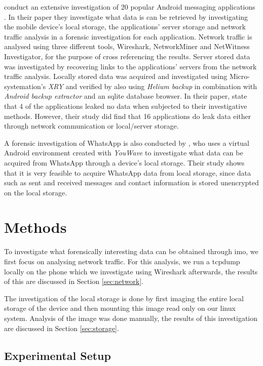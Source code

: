 \documentclass[conference]{IEEEtran}
\begin{document}
\citeauthor{walnycky2015network} conduct an extensive investigation of 20
popular Android messaging applications \cite{walnycky2015network}. In their
paper they investigate what data is can be retrieved by investigating the mobile
device's local storage, the applications' server storage and network traffic
analysis in a forensic investigation for each application. Network traffic is
analysed using three different tools, Wireshark, NetworkMiner and NetWitness
Investigator, for the purpose of cross referencing the results. Server stored
data was investigated by recovering links to the applications' servers from the
network traffic analysis. Locally stored data was acquired and investigated
using Micro-systemation's {\it XRY} and verified by also using {\it Helium
backup} in combination with {\it Android backup extractor} and an sqlite
database browser.  In their paper, \citeauthor{walnycky2015network} state that 4
of the applications leaked no data when subjected to their investigative
methods.  However, their study did find that 16 applications do leak data either
through network communication or local/server storage.

A forensic investigation of WhatsApp is also conducted by
\citeauthor{anglano2014forensic} \cite{anglano2014forensic}, who uses a virtual
Android environment created with {\it YouWave} to investigate what data can be
acquired from WhatsApp through a device's local storage. Their study shows that
it is very feasible to acquire WhatsApp data from local storage, since data such
as sent and received messages and contact information is stored unencrypted on
the local storage.


\section{Methods}\label{sec:method}

To investigate what forensically interesting data can be obtained through imo,
we first focus on analysing network traffic. For this analysis, we run a tcpdump
locally on the phone which we investigate using Wireshark afterwards, the
results of this are discussed in Section \ref{sec:network}.

The investigation of the local storage is done by first imaging the entire local
storage of the device and then mounting this image read only on our linux
system. Analysis of the image was done manually, the results of this
investigation are discussed in Section \ref{sec:storage}.


\subsection{Experimental Setup}
\end{document}
